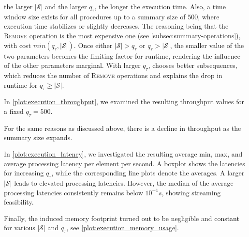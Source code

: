  the larger $|\mathcal{S}|$ and the larger $q_\tau$, the longer the execution
 time.
Also, a time window size exists for all
 procedures up to a summary size of $500$, where execution time stabilizes
 or slightly decreases. The reasoning being that the \textsc{Remove}
 operation is the most
 expensive one (see \autoref{subsec:summary-operations}), with cost
 $min(q_\tau,
 |\mathcal{S}|)$. Once either $|\mathcal{S}| > q_\tau$ or $q_\tau >
 |\mathcal{S}|$, the smaller value of the two parameters becomes the limiting
 factor for runtime, rendering the influence of the other parameters
 marginal. %
 With larger $q_\tau$, \suse{} chooses better subsequences, which reduces
 the number of \textsc{Remove} operations and explains the drop in
 runtime for $q_\tau \geq |\mathcal{S}|$.

In \autoref{plot:execution_throughput}, we examined the resulting throughput
values for a fixed $q_\tau = 500$.

For the same reasons as discussed above,
there is a decline in throughput as the summary size expands.


In \autoref{plot:execution_latency}, we investigated the resulting average
min, max, and average processing latency per element per second.
A boxplot shows the latencies for increasing $q_\tau$, while the
corresponding line plots denote the averages. A larger
$|\mathcal{S}|$ leads to
elevated processing latencies. However, the median of the
average processing latencies consistently remains below $10^{-1}s$, showing streaming feasibility.


Finally, the induced memory footprint turned out to be negligible and
constant for various $|\mathcal{S}|$ and $q_\tau$, see
\autoref{plot:execution_memory_usage}.

